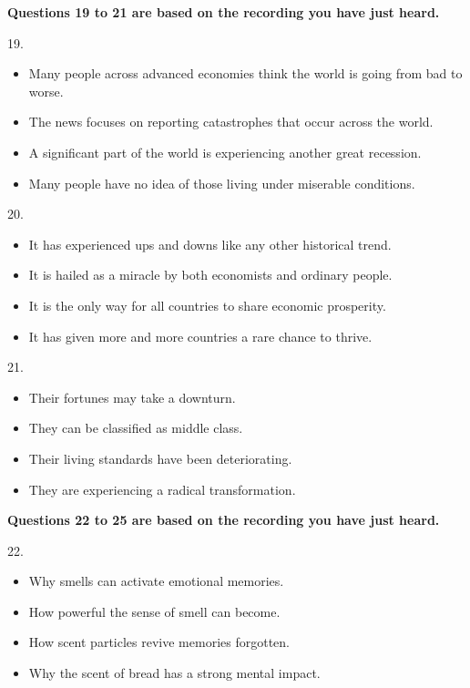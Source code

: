 \documentclass[UTF8,11pt]{ctexart}
\begin{document}
\textbf{Questions 19 to 21 are based on the recording you have just heard.}


19.


\begin{itemize}[leftmargin=2em,itemsep=.2em,topsep=.4em]\item[A.] Many people across advanced economies think the world is going from bad to worse.
\item[B.] The news focuses on reporting catastrophes that occur across the world.
\item[C.] A significant part of the world is experiencing another great recession.
\end{itemize}

\begin{itemize}[leftmargin=2em,itemsep=.2em,topsep=.4em]\item[D.] Many people have no idea of those living under miserable conditions.
\end{itemize}

20.


\begin{itemize}[leftmargin=2em,itemsep=.2em,topsep=.4em]\item[A.] It has experienced ups and downs like any other historical trend.
\item[B.] It is hailed as a miracle by both economists and ordinary people.
\item[C.] It is the only way for all countries to share economic prosperity.
\item[D.] It has given more and more countries a rare chance to thrive.
\end{itemize}

21.


\begin{itemize}[leftmargin=2em,itemsep=.2em,topsep=.4em]\item[A.] Their fortunes may take a downturn.
\item[B.] They can be classified as middle class.
\item[C.] Their living standards have been deteriorating.
\item[D.] They are experiencing a radical transformation.
\end{itemize}

\textbf{Questions 22 to 25 are based on the recording you have just heard.}


22.


\begin{itemize}[leftmargin=2em,itemsep=.2em,topsep=.4em]\item[A.] Why smells can activate emotional memories.
\item[B.] How powerful the sense of smell can become.
\item[C.] How scent particles revive memories forgotten.
\item[D.] Why the scent of bread has a strong mental impact.
\end{itemize}
\end{document}
